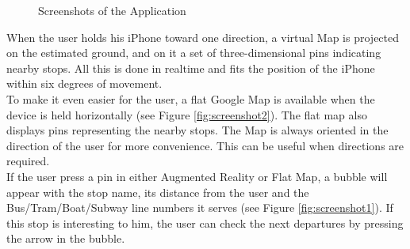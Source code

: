 \begin{figure}[ht]
\hspace{0.2cm}
\caption{Screenshots of the Application}
\label{fig:client_view_hierarchy}
\end{figure}

When the user holds his iPhone toward one direction, a virtual Map is projected on the estimated ground, and on it a set of three-dimensional pins indicating nearby stops. All this is done in realtime and fits the position of the iPhone within six degrees of movement.\\

To make it even easier for the user, a flat Google Map is available when the device is held horizontally (see Figure \ref{fig:screenshot2}). The flat map also displays pins representing the nearby stops. The Map is always oriented in the direction of the user for more convenience. This can be useful when directions are required. \\

If the user press a pin in either Augmented Reality or Flat Map, a bubble will appear with the stop name, its distance from the user and the Bus/Tram/Boat/Subway line numbers it serves (see Figure \ref{fig:screenshot1}). If this stop is interesting to him, the user can check the next departures by pressing the arrow in the bubble.\\

